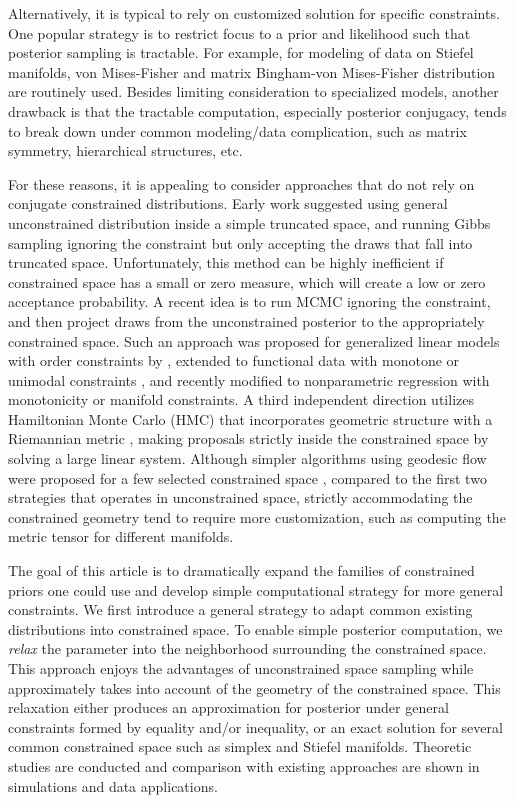 \documentclass[10pt,fleqn]{article}
\DeclareMathOperator{\1}{\mathbbm{1}}
\begin{document}
Alternatively, it is typical to rely on customized solution for specific
constraints. One popular strategy is to restrict focus to a prior and
likelihood such that posterior sampling is tractable. For example, for
modeling of data on Stiefel manifolds, von Mises-Fisher and matrix Bingham-von
Mises-Fisher distribution  \citep{khatri1977mises,hoff2009simulation} are
routinely used. Besides limiting consideration to specialized models, another  drawback is that the tractable computation, especially posterior conjugacy, tends to break down under common modeling/data complication, such as matrix symmetry, hierarchical structures, etc.

For these reasons, it is appealing to consider approaches that do not rely on conjugate constrained distributions. Early work \citep{gelfand1992bayesian} suggested using general unconstrained distribution inside a simple truncated space, and running Gibbs sampling ignoring the constraint but only accepting the draws that fall into truncated space. Unfortunately, this method can be highly inefficient if constrained space has a small or zero measure, which
will create a low or zero  acceptance probability. A recent  idea is to run MCMC ignoring the constraint, and then project draws from the unconstrained posterior to the appropriately constrained space. Such an approach was proposed for generalized linear models with order constraints by \cite{dunson2003bayesian}, extended to functional data with monotone or unimodal constraints \citep{gunn2005transformation}, and
recently modified to nonparametric regression with monotonicity
\citep{lin2014monogp} or manifold \citep{lin2016extrinsic} constraints. A
third independent direction utilizes Hamiltonian Monte Carlo (HMC) that incorporates geometric structure with a Riemannian metric \citep{girolami2011riemann}, making proposals strictly inside the constrained space by solving a large
linear system. Although simpler
algorithms using  geodesic flow were proposed for a few selected constrained space \citep{byrne2013geodesic}, compared to the first two strategies that
operates in unconstrained space, 
strictly accommodating the constrained geometry tend to require more customization,
such as computing the metric tensor for different manifolds.

 
The goal of this article is to dramatically expand the families of constrained priors one could use and develop simple computational strategy for more general
constraints. We first introduce a general strategy to adapt common existing distributions into constrained space. To enable simple posterior computation, we {\em relax} the parameter into the neighborhood surrounding the constrained space. This 
approach enjoys the advantages of unconstrained space sampling while approximately
takes into account of the geometry of the constrained space. This relaxation either produces an approximation for posterior under general constraints formed by equality and/or inequality, or an exact solution for several common constrained space such as simplex and Stiefel manifolds. Theoretic
studies are conducted and comparison with existing approaches  are shown in simulations and data
applications.
\end{document}
